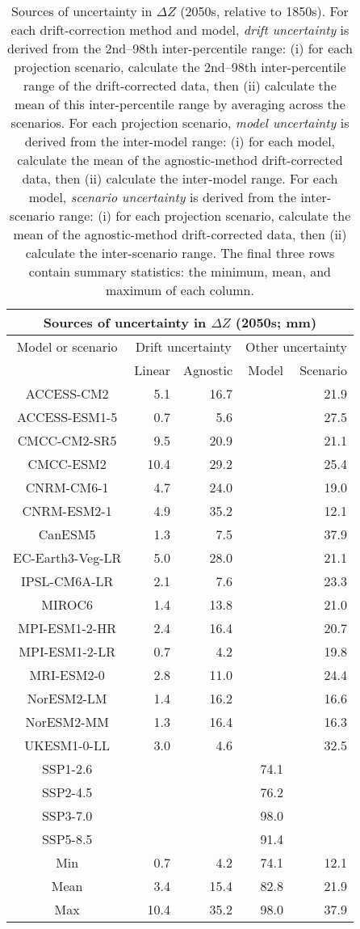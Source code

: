 \begin{table*}[t]
\centering
\caption{Sources of uncertainty in $\Delta Z$ (2050s, relative to 1850s). For each drift-correction method and model, \emph{drift uncertainty} is derived from the 2nd--98th inter-percentile range: (i) for each projection scenario, calculate the 2nd--98th inter-percentile range of the drift-corrected data, then (ii) calculate the mean of this inter-percentile range by averaging across the scenarios. For each projection scenario, \emph{model uncertainty} is derived from the inter-model range: (i) for each model, calculate the mean of the agnostic-method drift-corrected data, then (ii) calculate the inter-model range. For each model, \emph{scenario uncertainty} is derived from the inter-scenario range: (i) for each projection scenario, calculate the mean of the agnostic-method drift-corrected data, then (ii) calculate the inter-scenario range. The final three rows contain summary statistics: the minimum, mean, and maximum of each column.}
\begin{tabular}{c|rr|rr}
\toprule
\multicolumn{5}{c}{Sources of uncertainty in $\Delta Z$ (2050s; mm)} \\ 
\midrule
Model or scenario & \multicolumn{2}{c|}{Drift uncertainty} & \multicolumn{2}{c}{Other uncertainty} \\
 & Linear & Agnostic & Model & Scenario \\
\midrule
ACCESS-CM2 & 5.1 & 16.7 &  & 21.9 \\
ACCESS-ESM1-5 & 0.7 & 5.6 &  & 27.5 \\
CMCC-CM2-SR5 & 9.5 & 20.9 &  & 21.1 \\
CMCC-ESM2 & 10.4 & 29.2 &  & 25.4 \\
CNRM-CM6-1 & 4.7 & 24.0 &  & 19.0 \\
CNRM-ESM2-1 & 4.9 & 35.2 &  & 12.1 \\
CanESM5 & 1.3 & 7.5 &  & 37.9 \\
EC-Earth3-Veg-LR & 5.0 & 28.0 &  & 21.1 \\
IPSL-CM6A-LR & 2.1 & 7.6 &  & 23.3 \\
MIROC6 & 1.4 & 13.8 &  & 21.0 \\
MPI-ESM1-2-HR & 2.4 & 16.4 &  & 20.7 \\
MPI-ESM1-2-LR & 0.7 & 4.2 &  & 19.8 \\
MRI-ESM2-0 & 2.8 & 11.0 &  & 24.4 \\
NorESM2-LM & 1.4 & 16.2 &  & 16.6 \\
NorESM2-MM & 1.3 & 16.4 &  & 16.3 \\
UKESM1-0-LL & 3.0 & 4.6 &  & 32.5 \\
SSP1-2.6 &  &  & 74.1 &  \\
SSP2-4.5 &  &  & 76.2 &  \\
SSP3-7.0 &  &  & 98.0 &  \\
SSP5-8.5 &  &  & 91.4 &  \\
\midrule
Min & 0.7 & 4.2 & 74.1 & 12.1 \\
Mean & 3.4 & 15.4 & 82.8 & 21.9 \\
Max & 10.4 & 35.2 & 98.0 & 37.9 \\
\bottomrule
\end{tabular}
\end{table*}
